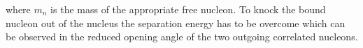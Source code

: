 where $m_n$ is the mass of the appropriate free nucleon.
To knock the bound nucleon out of the nucleus the separation energy has to be overcome which can be observed in the reduced opening angle of the two outgoing correlated nucleons.
%

